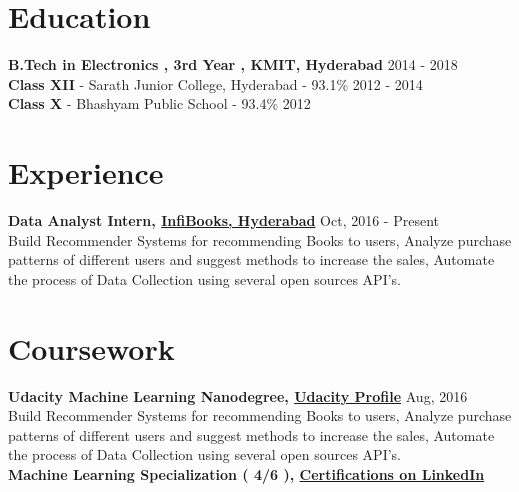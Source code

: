 \documentclass[margin, centered]{res}
\begin{document}
\begin{resume}

\section{Education}
\textbf{B.Tech in Electronics , 3rd Year , KMIT, Hyderabad} \hfill 2014 - 2018 \\
\textbf{Class XII} - {Sarath Junior College, Hyderabad} - 93.1\% \hfill 2012 - 2014 \\
\textbf{Class X} - Bhashyam Public School - 93.4\% \hfill 2012
 
\section{Experience}
\textbf{Data Analyst Intern, \href{http://www.infibooks.com/}{InfiBooks, Hyderabad}} \hfill Oct, 2016 - Present\\
Build Recommender Systems for recommending Books to users, Analyze purchase patterns of different users and suggest methods to increase the sales, Automate the process of Data Collection using several open sources API's.

\section{Coursework}
\textbf{Udacity Machine Learning Nanodegree, \href{https://profiles.udacity.com/u/chaitanyadevaguptapu}{Udacity Profile}} \hfill Aug, 2016 \\
Build Recommender Systems for recommending Books to users, Analyze purchase patterns of different users and suggest methods to increase the sales, Automate the process of Data Collection using several open sources API's. \\ 
\textbf{Machine Learning Specialization ( 4/6 ), \href{Profilehttps://in.linkedin.com/in/tdchaitanya}{Certifications on LinkedIn}} \\


\end{resume}
\end{document}
